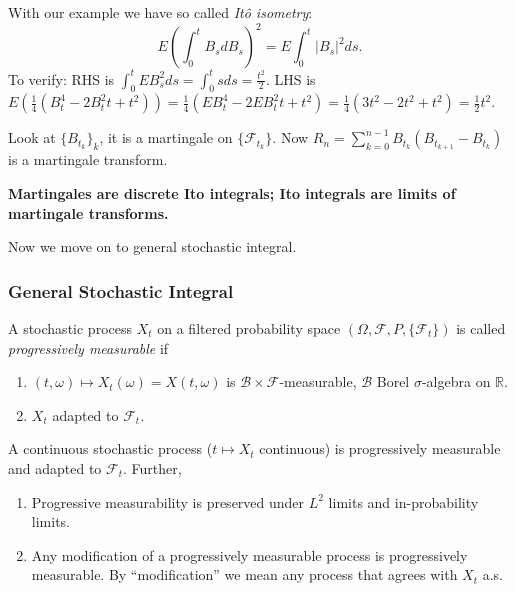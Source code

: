 
\begin{remark}
	With our example we have so called \textit{Itô isometry}:
	\[
		E\left( \int _0^t B_s d B_s \right) ^2 
		= E \int _0^t |B_s|^2 d s
	.\] 
	To verify: RHS is $\int _0^t E B_s^2 ds = \int _0^t s ds = \frac{t^2}{2}$. LHS is $E\left( \frac{1}{4} \left( B_t^4 - 2 B_t^2 t + t^2 \right)  \right) = \frac{1}{4}\left( E B_t^4 - 2 E B_t^2 t + t^2 \right) = \frac{1}{4} \left( 3 t^2 - 2 t^2 + t^2 \right) = \frac{1}{2} t^2$.
\end{remark}

\begin{remark}
	Look at $\{B_{t_k}\} _k$, it is a martingale on $\{\mathcal{F}_{t_k}\} $. Now $R_n = \sum_{k=0}^{n-1} B_{t_k} \left( B_{t_{k+1}} - B_{t_k} \right) $ is a martingale transform. 

	\textbf{Martingales are discrete Ito integrals; Ito integrals are limits of martingale transforms.}
\end{remark}

Now we move on to general stochastic integral.

\subsubsection{General Stochastic Integral}


\begin{definition}
	A stochastic process $X_t$ on a filtered probability space $\left(\Omega, \mathcal{F}, P, \{\mathcal{F}_t\}\right) $ is called \textit{progressively measurable} if
	\begin{enumerate}
		\item $(t, \omega) \mapsto X_t(\omega) = X(t, \omega)$ is $\mathcal{B} \times \mathcal{F}$-measurable, $\mathcal{B}$ Borel $\sigma$-algebra on $\mathbb{R}$.
		\item $X_t$ adapted to $\mathcal{F}_t$.
	\end{enumerate}
\end{definition}

\begin{proposition}
	A continuous stochastic process ($t \mapsto X_t$ continuous) is progressively measurable and adapted to $\mathcal{F}_t$. Further,
	\begin{enumerate}
		\item Progressive measurability is preserved under $L^2$ limits and in-probability limits.
		\item Any modification of a progressively measurable process is progressively measurable. By ``modification'' we mean any process that agrees with $X_t$ a.s.
	\end{enumerate}
\end{proposition}

